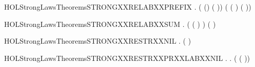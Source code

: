 \newcommand{\HOLStrongLawsTheoremsSTRONGXXRELABXXNIL}{\UseVerbatim{HOLStrongLawsTheoremsSTRONGXXRELABXXNIL}}
\begin{SaveVerbatim}{HOLStrongLawsTheoremsSTRONGXXRELABXXPREFIX}
\HOLTokenTurnstile{} \HOLSymConst{\HOLTokenForall{}}  .
        ( () ( ))
         ( ( )   ( ))
\end{SaveVerbatim}
\newcommand{\HOLStrongLawsTheoremsSTRONGXXRELABXXPREFIX}{\UseVerbatim{HOLStrongLawsTheoremsSTRONGXXRELABXXPREFIX}}
\begin{SaveVerbatim}{HOLStrongLawsTheoremsSTRONGXXRELABXXSUM}
\HOLTokenTurnstile{} \HOLSymConst{\HOLTokenForall{}}  .
        ( ( \HOLSymConst{+} ) )
         (   \HOLSymConst{+}   )
\end{SaveVerbatim}
\newcommand{\HOLStrongLawsTheoremsSTRONGXXRELABXXSUM}{\UseVerbatim{HOLStrongLawsTheoremsSTRONGXXRELABXXSUM}}
\begin{SaveVerbatim}{HOLStrongLawsTheoremsSTRONGXXRESTRXXNIL}
\HOLTokenTurnstile{} \HOLSymConst{\HOLTokenForall{}}.  (\HOLConst{\ensuremath{\nu}}  ) 
\end{SaveVerbatim}
\newcommand{\HOLStrongLawsTheoremsSTRONGXXRESTRXXNIL}{\UseVerbatim{HOLStrongLawsTheoremsSTRONGXXRESTRXXNIL}}
\begin{SaveVerbatim}{HOLStrongLawsTheoremsSTRONGXXRESTRXXPRXXLABXXNIL}
\HOLTokenTurnstile{} \HOLSymConst{\HOLTokenForall{}} .
        \HOLConst{\HOLTokenIn{}}  \HOLSymConst{\HOLTokenDisj{}}   \HOLConst{\HOLTokenIn{}}  \HOLSymConst{\HOLTokenImp{}}
       \HOLSymConst{\HOLTokenForall{}}.  (\HOLConst{\ensuremath{\nu}}  ( )) 
\end{SaveVerbatim}
\newcommand{\HOLStrongLawsTheoremsSTRONGXXRESTRXXPRXXLABXXNIL}{\UseVerbatim{HOLStrongLawsTheoremsSTRONGXXRESTRXXPRXXLABXXNIL}}

